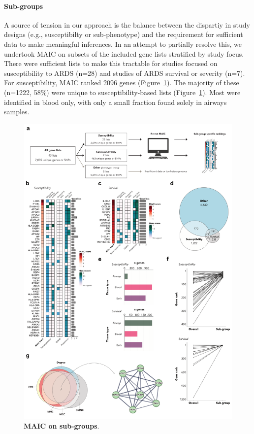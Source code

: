 \documentclass[
  11,
  a4paper,
]{article}
\let\oldparagraph\paragraph
\renewcommand{\paragraph}[1]{\oldparagraph{#1}\mbox{}}
\begin{document}
\hypertarget{sub-groups}{%
\paragraph{Sub-groups}\label{sub-groups}}

A source of tension in our approach is the balance between the dispartiy
in study designs (e.g., susceptibilty or sub-phenotype) and the
requirement for sufficient data to make meaningful inferences. In an
attempt to partially resolve this, we undertook MAIC on subsets of the
included gene lists stratified by study focus. There were sufficient
lists to make this tractable for studies focused on susceptibility to
ARDS (n=28) and studies of ARDS survival or severity (n=7). For
susceptibility, MAIC ranked 2096 genes (Figure~\ref{fig-fig4}). The
majority of these (n=1222, 58\%) were unique to susceptibility-based
lists (Figure~\ref{fig-fig4}). Most were identified in blood only, with
only a small fraction found solely in airways samples.

\begin{figure}

{\centering \includegraphics{./img/Figure_4.png}

}

\caption{\label{fig-fig4}\textbf{MAIC on sub-groups}.}

\end{figure}
\end{document}
